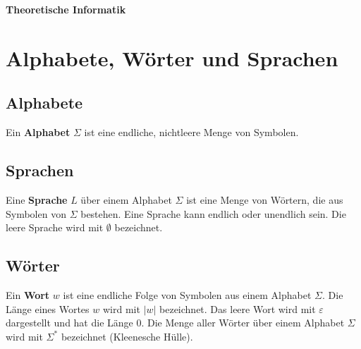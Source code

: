 \documentclass{article}
\begin{document}
\begin{center}
    \textbf{\LARGE Theoretische Informatik}
\end{center}

\section*{Alphabete, Wörter und Sprachen}
\begin{minipage}[t]{0.45\textwidth}
    \subsection*{Alphabete}
    Ein \textbf{Alphabet} $\Sigma$ ist eine endliche, nichtleere Menge von Symbolen.
    
    \subsection*{Sprachen}
    Eine \textbf{Sprache} $L$ über einem Alphabet $\Sigma$ ist eine Menge von Wörtern, die aus Symbolen von $\Sigma$ bestehen. Eine Sprache kann endlich oder unendlich sein. Die leere Sprache wird mit $\emptyset$ bezeichnet.
\end{minipage}
\hfill
\begin{minipage}[t]{0.45\textwidth}
    \subsection*{Wörter}
    Ein \textbf{Wort} $w$ ist eine endliche Folge von Symbolen aus einem Alphabet $\Sigma$. Die Länge eines Wortes $w$ wird mit $|w|$ bezeichnet. Das leere Wort wird mit $\varepsilon$ dargestellt und hat die Länge 0.
    Die Menge aller Wörter über einem Alphabet $\Sigma$ wird mit $\Sigma^*$ bezeichnet (Kleenesche Hülle). 
\end{minipage}
\end{document}
